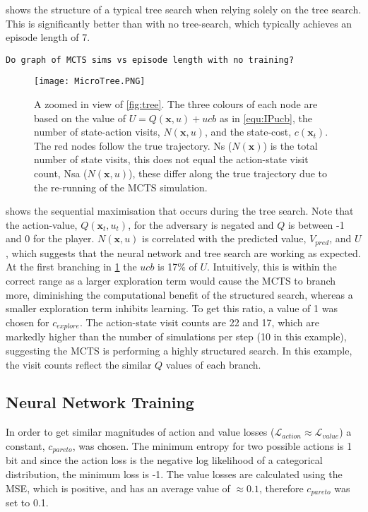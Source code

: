\documentclass[../main.tex]{subfiles}
\begin{document}
 shows the structure of a typical tree search when relying solely on the tree search. This is significantly better than with no tree-search, which typically achieves an episode length of 7.

\texttt{Do graph of MCTS sims vs episode length with no training?}

\begin{figure}[h]
    \centering
    \texttt{[image: MicroTree.PNG]}
    \caption{A zoomed in view of \cref{fig:tree}. The three colours of each node are based on the value of $U=Q(\boldsymbol{x}, u) + ucb$ as in \cref{equ:IPucb}, the number of state-action visits, $N(\boldsymbol{x}, u)$, and the state-cost, $c(\boldsymbol{x}_t)$. The red nodes follow the true trajectory. Ns ($N(\boldsymbol{x})$) is the total number of state visits, this does not equal the action-state visit count, Nsa ($N(\boldsymbol{x}, u)$), these differ along the true trajectory due to the re-running of the MCTS simulation.}
    \label{fig:microtree}
\end{figure}

 shows the sequential maximisation that occurs during the tree search. Note that the action-value, $Q(\boldsymbol{x}_t, u_t)$, for the adversary is negated and $Q$ is between -1 and 0 for the player. $N(\boldsymbol{x}, u)$ is correlated with the predicted value, $V_{pred}$, and $U$, which suggests that the neural network and tree search are working as expected. At the first branching in \cref{fig:microtree} the $ucb$ is 17\% of $U$. Intuitively, this is within the correct range as a larger exploration term would cause the MCTS to branch more, diminishing the computational benefit of the structured search, whereas a smaller exploration term inhibits learning. To get this ratio, a value of 1 was chosen for $c_{explore}$. The action-state visit counts are 22 and 17, which are markedly higher than the number of simulations per step (10 in this example), suggesting the MCTS is performing a highly structured search. In this example, the visit counts reflect the similar $Q$ values of each branch.

\subsection{Neural Network Training}

In order to get similar magnitudes of action and value losses ($\mathcal{L}_{action} \approx \mathcal{L}_{value}$) a constant, $c_{pareto}$, was chosen. The minimum entropy for two possible actions is 1 bit and since the action loss is the negative log likelihood of a categorical distribution, the minimum loss is -1. The value losses are calculated using the MSE, which is positive, and has an average value of $\approx 0.1$, therefore  $c_{pareto}$ was set to 0.1. 
\end{document}
